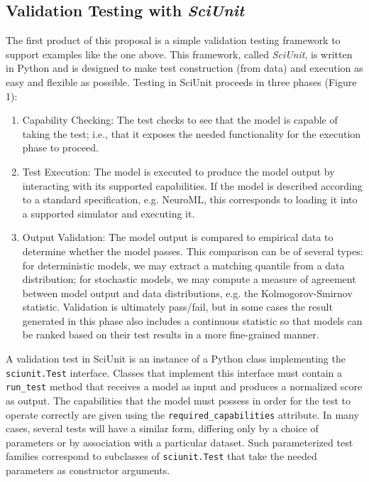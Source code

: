 \documentclass[11pt,letterpaper]{article}
\begin{document}
\subsection{Validation Testing with \emph{SciUnit}} 
The first product of this proposal is a simple validation testing framework to support examples like the one above. This framework, called \emph{SciUnit}, is written in Python and is designed to make test construction (from data) and execution as easy and flexible as possible. Testing in SciUnit proceeds in three phases (Figure 1):
\begin{enumerate}
\item Capability Checking: The test checks to see that the model is capable of taking the test; i.e., that it exposes the needed functionality for the execution phase to proceed.
\item Test Execution: The model is executed to produce the model output by interacting with its supported capabilities.  If the model is described according to a standard specification, e.g. NeuroML, this corresponds to loading it into a supported simulator and executing it. 
\item Output Validation: The model output is compared to empirical data to determine whether the model passes.  This comparison can be of several types: for deterministic models, we may extract a matching quantile from a data distribution; for stochastic models, we may compute a measure of agreement between model output and data distributions, e.g. the Kolmogorov-Smirnov statistic.  Validation is ultimately pass/fail, but in some cases the result generated in this phase also includes a continuous statistic so that models can be ranked based on their test results in a more fine-grained manner.   
\end{enumerate}

A validation test in SciUnit is an instance of a Python class implementing the \verb|sciunit.Test| interface. Classes that implement this interface must contain a \verb|run_test| method that receives a model as input and produces a normalized score as output. The capabilities that the model must possess in order for the test to operate correctly are given using the \verb|required_capabilities| attribute. In many cases, several tests will have a similar form, differing only by a choice of parameters or by association with a particular dataset. Such parameterized test families correspond to subclasses of \verb|sciunit.Test| that take the needed parameters as constructor arguments. 
\end{document}
